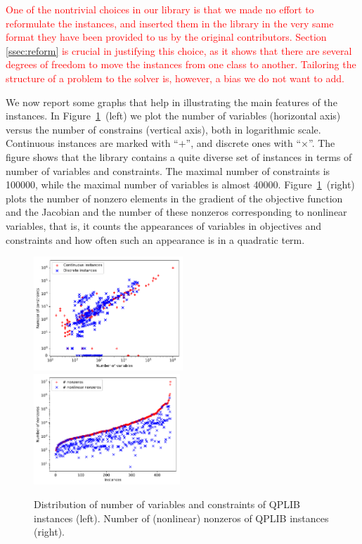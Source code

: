 \textcolor{red}{
One of the nontrivial choices in our library is that we made no effort to reformulate the instances, and inserted them in the library in the very same format they have been provided to us by the original contributors. Section \ref{ssec:reform} is crucial in justifying this choice, as it shows that there are several degrees of freedom to move the instances from one class to another. Tailoring the structure of a problem to the solver is, however, a bias we do not want to add.
}

We now report some graphs that help in illustrating the main features
of the instances. In Figure~\ref{fig:distribution}~(left) we plot the number
of variables (horizontal axis) versus the number of constrains
(vertical axis), both in logarithmic scale. Continuous instances are
marked with ``$+$'', and discrete ones with ``$\times$''. The figure shows
that the library contains a quite diverse set of instances in
terms of number of variables and constraints. The maximal number of constraints
is 100000, while the maximal number of
variables is almost 40000.
Figure~\ref{fig:distribution}~(right) plots the number of nonzero elements in the gradient of the objective function and the Jacobian and the number of these nonzeros corresponding to nonlinear variables, that is, it counts the appearances of variables in objectives and constraints and how often such an appearance is in a quadratic term.

\begin{figure}\centering
  \includegraphics[width=0.50\textwidth]{pic_overview.pdf}
  \includegraphics[width=0.49\textwidth]{pic_nz.pdf}
  \caption{Distribution of number of variables and constraints of QPLIB instances
(left). Number of (nonlinear) nonzeros of QPLIB instances (right).\label{fig:distribution}}
\end{figure}


